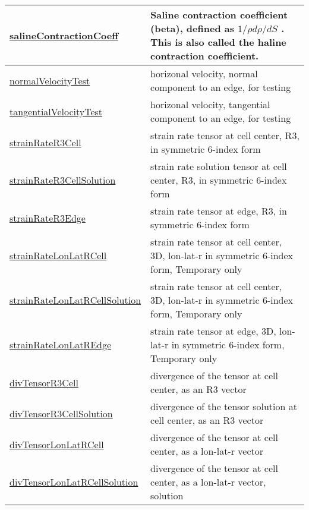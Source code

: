 {\begin{center}
\begin{longtable}{| p{2.0in} | p{4.0in} |}
	\hline
	\hyperref[subsec:var_sec_scratch_salineContractionCoeff]{salineContractionCoeff} &  Saline contraction coefficient (beta), defined as  $1/\rho d\rho/dS$ .  This is also called the haline contraction coefficient. \\
	\hline
	\hyperref[subsec:var_sec_scratch_normalVelocityTest]{normalVelocityTest} & horizonal velocity, normal component to an edge, for testing \\
	\hline
	\hyperref[subsec:var_sec_scratch_tangentialVelocityTest]{tangentialVelocityTest} & horizonal velocity, tangential component to an edge, for testing \\
	\hline
	\hyperref[subsec:var_sec_scratch_strainRateR3Cell]{strainRateR3Cell} & strain rate tensor at cell center, R3, in symmetric 6-index form \\
	\hline
	\hyperref[subsec:var_sec_scratch_strainRateR3CellSolution]{strainRateR3CellSolution} & strain rate solution tensor at cell center, R3, in symmetric 6-index form \\
	\hline
	\hyperref[subsec:var_sec_scratch_strainRateR3Edge]{strainRateR3Edge} & strain rate tensor at edge, R3, in symmetric 6-index form \\
	\hline
	\hyperref[subsec:var_sec_scratch_strainRateLonLatRCell]{strainRateLonLatRCell} & strain rate tensor at cell center, 3D, lon-lat-r in symmetric 6-index form, {\color{red}Temporary only} \\
	\hline
	\hyperref[subsec:var_sec_scratch_strainRateLonLatRCellSolution]{strainRateLonLatRCellSolution} & strain rate tensor at cell center, 3D, lon-lat-r in symmetric 6-index form, {\color{red}Temporary only} \\
	\hline
	\hyperref[subsec:var_sec_scratch_strainRateLonLatREdge]{strainRateLonLatREdge} & strain rate tensor at edge, 3D, lon-lat-r in symmetric 6-index form, {\color{red}Temporary only} \\
	\hline
	\hyperref[subsec:var_sec_scratch_divTensorR3Cell]{divTensorR3Cell} & divergence of the tensor at cell center, as an R3 vector \\
	\hline
	\hyperref[subsec:var_sec_scratch_divTensorR3CellSolution]{divTensorR3CellSolution} & divergence of the tensor solution at cell center, as an R3 vector \\
	\hline
	\hyperref[subsec:var_sec_scratch_divTensorLonLatRCell]{divTensorLonLatRCell} & divergence of the tensor at cell center, as a lon-lat-r vector \\
	\hline
	\hyperref[subsec:var_sec_scratch_divTensorLonLatRCellSolution]{divTensorLonLatRCellSolution} & divergence of the tensor at cell center, as a lon-lat-r vector, solution \\

\end{longtable}
\end{center}}
